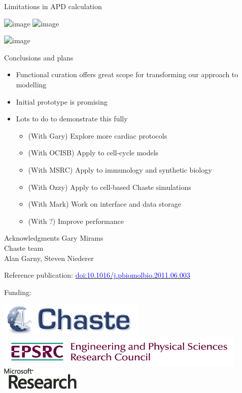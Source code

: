 \documentclass[t,xcolor={usenames,dvipsnames}]{beamer}
\newcommand{\myhref}[2]{\href{#1}{\textcolor{Blue}{#2}}}
\newcommand{\doi}[1]{\myhref{http://dx.doi.org/#1}{doi:#1}}
\begin{document}
\begin{frame}{Limitations in APD calculation}
\begin{center}
\includegraphics<1>{faber_rudy_2000_s1s2_curve}
\includegraphics<2>[height=.9\textheight]{faber_rudy_2000_COR_comparison}
\end{center}
\includegraphics<3>[height=.8\textheight]{nygren_s1s2_V}
\end{frame}

\begin{frame}{Conclusions and plans}
\begin{itemize}
\item Functional curation offers great scope for transforming our approach to modelling
\item Initial prototype is promising
\item Lots to do to demonstrate this fully
  \begin{itemize}
  \item (With Gary) Explore more cardiac protocols
  \item (With OCISB) Apply to cell-cycle models
  \item (With MSRC) Apply to immunology and synthetic biology
  \item (With Ozzy) Apply to cell-based Chaste simulations
  \item (With Mark) Work on interface and data storage
  \item (With ?) Improve performance
  \end{itemize}
\end{itemize}
\end{frame}


\begin{frame}{Acknowledgments}
Gary Mirams\\
Chaste team\\
Alan Garny, Steven Niederer

Reference publication: \doi{10.1016/j.pbiomolbio.2011.06.003}

Funding:

\begin{center}
\includegraphics[scale=.9]{chaste-266x60}\\ \vspace{.4cm}
\includegraphics[width=.55\textwidth]{EPSRC1RGBLO} \hspace{.1cm}
\includegraphics[scale=.55]{logo_msr}
\end{center}
\end{frame}
\end{document}
